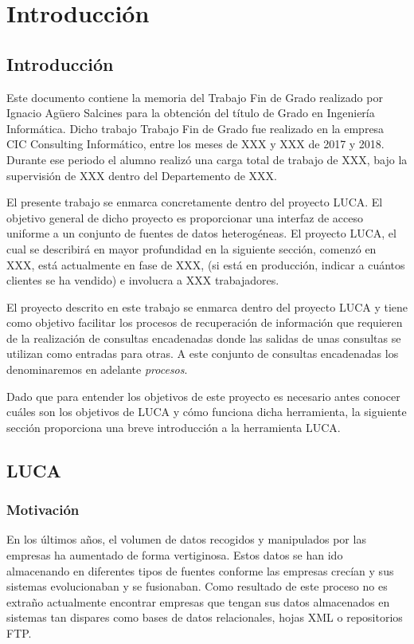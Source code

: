 \chapter{Introducción}

\minitoc
	
\section{Introducción}

Este documento contiene la memoria del Trabajo Fin de Grado realizado por Ignacio Agüero Salcines para la obtención del título de Grado en Ingeniería Informática. Dicho trabajo Trabajo Fin de Grado fue realizado en la empresa CIC Consulting Informático, entre los meses de XXX y XXX de 2017 y 2018. Durante ese periodo el alumno realizó una carga total de trabajo de XXX, bajo la supervisión de XXX dentro del Departemento de XXX.

El presente trabajo se enmarca concretamente dentro del proyecto LUCA. El objetivo general de dicho proyecto es proporcionar una interfaz de acceso uniforme a un conjunto de fuentes de datos heterogéneas. El proyecto LUCA, el cual se describirá en mayor profundidad en la siguiente sección, comenzó en XXX, está actualmente en fase de XXX, (si está en producción, indicar a cuántos clientes se ha vendido) e involucra a XXX trabajadores.

El proyecto descrito en este trabajo se enmarca dentro del proyecto LUCA y tiene como objetivo facilitar los procesos de recuperación de información que requieren de la realización de consultas encadenadas donde las salidas de unas consultas se utilizan como entradas para otras. A este conjunto de consultas encadenadas los denominaremos en adelante \emph{procesos}. 

Dado que para entender los objetivos de este proyecto es necesario antes conocer cuáles son los objetivos de LUCA y cómo funciona dicha herramienta, la siguiente sección proporciona una breve introducción a la herramienta LUCA.

\section{LUCA}

\subsection{Motivación}

En los últimos años, el volumen de datos recogidos y manipulados por las empresas ha aumentado de forma vertiginosa. Estos datos se han ido almacenando en diferentes tipos de fuentes conforme las empresas crecían y sus sistemas evolucionaban y se fusionaban. Como resultado de  este proceso no es extraño actualmente encontrar empresas que tengan sus datos almacenados en sistemas tan dispares como bases de datos relacionales, hojas XML o repositorios FTP.

